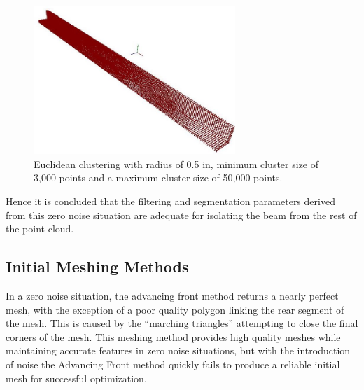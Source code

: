 \documentclass[12pt]{drexelthesis}
\let\Oldsubsection\subsection
\renewcommand{\subsection}{\FloatBarrier\Oldsubsection}
\begin{document}
\begin{figure}[!ht]
	\centering
		\includegraphics[width=3in]{simulated-lab-scan/0noise/euclidean-d05max50000min3000.jpg}
		\caption[Euclidean distance segmentation with ideal parameters.]{\centering  Euclidean clustering with radius of 0.5 in, minimum cluster size of 3,000 points and a maximum cluster size of 50,000 points.}
	\label{zeronoise:optimal}
\end{figure}

Hence it is concluded that the filtering and segmentation parameters derived from this zero noise situation are adequate for isolating the beam from the rest of the point cloud.


\subsection{Initial Meshing Methods}

In a zero noise situation, the advancing front method returns a nearly perfect mesh, with the exception of a poor quality polygon linking the rear segment of the mesh. This is caused by the ``marching triangles'' attempting to close the final corners of the mesh. This meshing method provides high quality meshes while maintaining accurate features in zero noise situations, but with the introduction of noise the Advancing Front method quickly fails to produce a reliable initial mesh for successful optimization.
\end{document}
